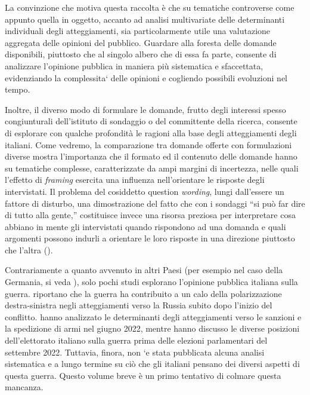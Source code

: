 \documentclass[
  openany]{book}
\begin{document}
La convinzione che motiva questa raccolta è che su tematiche controverse come appunto quella in oggetto, accanto ad analisi multivariate delle determinanti individuali degli atteggiamenti, sia particolarmente utile una valutazione aggregata delle opinioni del pubblico. Guardare alla foresta delle domande disponibili, piuttosto che al singolo albero che di essa fa parte, consente di analizzare l'opinione pubblica in maniera più sistematica e sfaccettata, evidenziando la complessita` delle opinioni e cogliendo possibili evoluzioni nel tempo.

Inoltre, il diverso modo di formulare le domande, frutto degli interessi spesso congiunturali dell'istituto di sondaggio o del committente della ricerca, consente di esplorare con qualche profondità le ragioni alla base degli atteggiamenti degli italiani. Come vedremo, la comparazione tra domande offerte con formulazioni diverse mostra l'importanza che il formato ed il contenuto delle domande hanno su tematiche complesse,
caratterizzate da ampi margini di incertezza, nelle quali l'effetto di \emph{framing} esercita una influenza nell'orientare le risposte degli intervistati. Il problema del cosiddetto question \emph{wording}, lungi dall'essere un fattore di disturbo, una dimostrazione del fatto che con i sondaggi ``si può far dire di tutto alla gente,'' costituisce invece una risorsa preziosa per interpretare cosa abbiano in mente gli intervistati quando rispondono ad una domanda e quali argomenti possono indurli a orientare le loro risposte in una direzione piuttosto che l'altra (\citet{Sudman-Bradburn1974}).

Contrariamente a quanto avvenuto in altri Paesi (per esempio nel caso della Germania,
si veda \citet{Mader-Schoen}), solo pochi studi esplorano l'opinione pubblica italiana
sulla guerra. \citet{Bordignon-Diamanti-Turato} riportano che la guerra ha contribuito a un calo
della polarizzazione destra-sinistra negli atteggiamenti verso la Russia subito dopo
l'inizio del conflitto. \citet{Isernia-Martini} hanno analizzato le determinanti degli
atteggiamenti verso le sanzioni e la spedizione di armi nel giugno 2022, mentre \citet{Basile-Isernia-Martini} hanno discusso le diverse posizioni dell'elettorato italiano sulla
guerra prima delle elezioni parlamentari del settembre 2022. Tuttavia, finora, non `e
stata pubblicata alcuna analisi sistematica e a lungo termine su ciò che gli italiani pensano dei diversi aspetti di questa guerra. Questo volume breve è un primo tentativo di
colmare questa mancanza.
\end{document}
